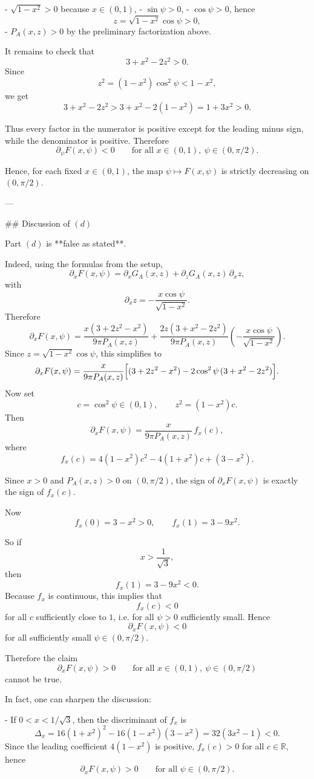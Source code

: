 - $\sqrt{1-x^2}>0$ because $x\in(0,1)$,
- $\sin\psi>0$,
- $\cos\psi>0$, hence
  \[
  z=\sqrt{1-x^2}\cos\psi>0,
  \]
- $P_A(x,z)>0$ by the preliminary factorization above.

It remains to check that
\[
3+x^2-2z^2>0.
\]
Since
\[
z^2=(1-x^2)\cos^2\psi<1-x^2,
\]
we get
\[
3+x^2-2z^2
>
3+x^2-2(1-x^2)
=
1+3x^2
>0.
\]

Thus every factor in the numerator is positive except for the leading minus sign, while the denominator is positive. Therefore
\[
\partial_\psi F(x,\psi)<0
\qquad\text{for all }x\in(0,1),\ \psi\in(0,\pi/2).
\]

Hence, for each fixed $x\in(0,1)$, the map $\psi\mapsto F(x,\psi)$ is strictly decreasing on $(0,\pi/2)$.

---

## Discussion of $(d)$

Part $(d)$ is **false as stated**.

Indeed, using the formulas from the setup,
\[
\partial_x F(x,\psi)
=\partial_x G_A(x,z)+\partial_z G_A(x,z)\,\partial_x z,
\]
with
\[
\partial_x z=-\frac{x\cos\psi}{\sqrt{1-x^2}}.
\]
Therefore
\[
\partial_x F(x,\psi)
=
\frac{x(3+2z^2-x^2)}{9\pi P_A(x,z)}
+
\frac{2z(3+x^2-2z^2)}{9\pi P_A(x,z)}
\left(-\frac{x\cos\psi}{\sqrt{1-x^2}}\right).
\]
Since $z=\sqrt{1-x^2}\cos\psi$, this simplifies to
\[
\partial_x F(x,\psi)
=
\frac{x}{9\pi P_A(x,z)}
\Bigl[(3+2z^2-x^2)-2\cos^2\psi\,(3+x^2-2z^2)\Bigr].
\]
Now set
\[
c=\cos^2\psi\in(0,1),
\qquad z^2=(1-x^2)c.
\]
Then
\[
\partial_x F(x,\psi)
=
\frac{x}{9\pi P_A(x,z)}\,f_x(c),
\]
where
\[
f_x(c)=4(1-x^2)c^2-4(1+x^2)c+(3-x^2).
\]

Since $x>0$ and $P_A(x,z)>0$ on $(0,\pi/2)$, the sign of $\partial_x F(x,\psi)$ is exactly the sign of $f_x(c)$.

Now
\[
f_x(0)=3-x^2>0,
\qquad
f_x(1)=3-9x^2.
\]

So if
\[
x>\frac1{\sqrt3},
\]
then
\[
f_x(1)=3-9x^2<0.
\]
Because $f_x$ is continuous, this implies that
\[
f_x(c)<0
\]
for all $c$ sufficiently close to $1$, i.e. for all $\psi>0$ sufficiently small. Hence
\[
\partial_x F(x,\psi)<0
\]
for all sufficiently small $\psi\in(0,\pi/2)$.

Therefore the claim
\[
\partial_x F(x,\psi)>0
\qquad\text{for all }x\in(0,1),\ \psi\in(0,\pi/2)
\]
cannot be true.

In fact, one can sharpen the discussion:

- If $0<x<1/\sqrt3$, then the discriminant of $f_x$ is
  \[
  \Delta_x
  =16(1+x^2)^2-16(1-x^2)(3-x^2)
  =32(3x^2-1)<0.
  \]
  Since the leading coefficient $4(1-x^2)$ is positive, $f_x(c)>0$ for all $c\in\mathbb R$, hence
  \[
  \partial_x F(x,\psi)>0
  \qquad\text{for all }\psi\in(0,\pi/2).
  \]

